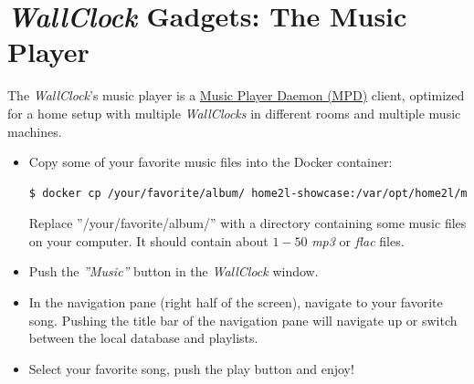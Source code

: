 \documentclass[12pt,english,parskip=half,headheight=19pt]{scrreprt}
\begin{document}
\clearpage
\section{\textit{WallClock} Gadgets: The Music Player}
\label{sec:tutorial-wallclock}


The \textit{WallClock}'s music player is a \href{https://www.musicpd.org/}{Music Player Daemon (MPD)} client, optimized for a home setup with multiple \textit{WallClocks} in different rooms and multiple music machines.

\begin{itemize}[$\blacktriangleright$]
\item
  Copy some of your favorite music files into the Docker container:
  \begin{lstlisting}[language=bash]
    $ docker cp /your/favorite/album/ home2l-showcase:/var/opt/home2l/mpd/music/
  \end{lstlisting}
  Replace ''/your/favorite/album/'' with a directory containing some music files on your computer.
  It should contain about $1 - 50$ \textit{mp3} or \textit{flac} files.

\item
  Push the \textit{''Music''} button in the \textit{WallClock} window.

\item
  In the navigation pane (right half of the screen), navigate to your
  favorite song. Pushing the title bar of the navigation pane will
  navigate up or switch between the local database and playlists.

\item
  Select your favorite song, push the play button and enjoy!

\end{itemize}
\end{document}
